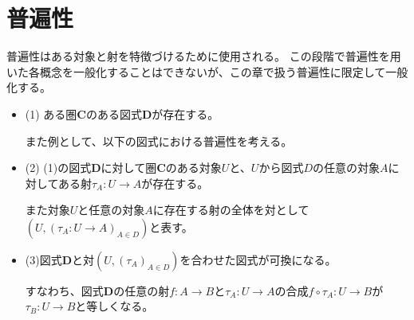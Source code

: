 \documentclass[dvipdfmx]{jsarticle}
\newcommand{\cat}[1]{\boldsymbol{#1}}
\newcommand{\arrow}{\rightarrow}
\newcommand{\mor}[3]{#1:#2\arrow #3}
\numberwithin{proof}{subsection}
\numberwithin{prop}{subsection}
\numberwithin{define}{subsection}
\begin{document}
	\section{普遍性}
	普遍性はある対象と射を特徴づけるために使用される。
	この段階で普遍性を用いた各概念を一般化することはできないが、この章で扱う普遍性に限定して一般化する。
	\begin{itemize}
		\item (1) ある圏$\cat{C}$のある図式$\cat{D}$が存在する。

		また例として、以下の図式における普遍性を考える。
		\begin{center}
		\end{center}
		\item (2) (1)の図式$\cat{D}$に対して圏$\cat{C}$のある対象$U$と、$U$から図式$D$の任意の対象$A$に対してある射$\mor{\tau_A}{U}{A}$が存在する。

		また対象$U$と任意の対象$A$に存在する射の全体を対として$(U,(\mor{\tau_A}{U}{A})_{A\in D})$と表す。
		\begin{center}
		\end{center}
		\item (3)図式$\cat{D}$と対$(U,(\tau_A)_{A\in D})$を合わせた図式が可換になる。

		すなわち、図式$\cat{D}$の任意の射$\mor{f}{A}{B}$と$\mor{\tau_A}{U}{A}$の合成$\mor{f\circ\tau_A}{U}{B}$が$\mor{\tau_B}{U}{B}$と等しくなる。


\end{itemize}
\end{document}
